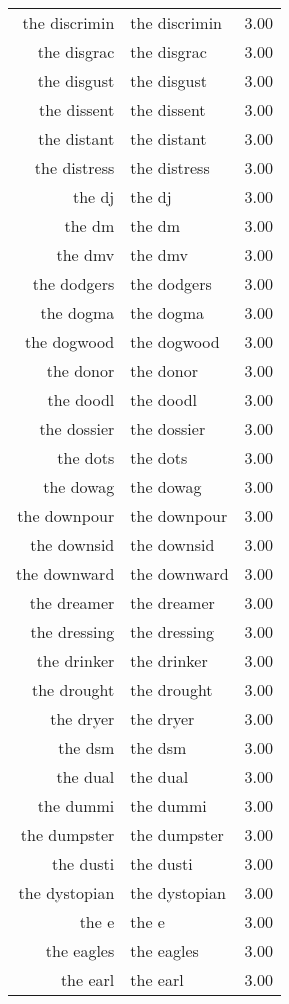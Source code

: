 \begin{table}[ht]
\begin{tabular}{rlr}
  the discrimin & the discrimin & 3.00 \\ 
  the disgrac & the disgrac & 3.00 \\ 
  the disgust & the disgust & 3.00 \\ 
  the dissent & the dissent & 3.00 \\ 
  the distant & the distant & 3.00 \\ 
  the distress & the distress & 3.00 \\ 
  the dj & the dj & 3.00 \\ 
  the dm & the dm & 3.00 \\ 
  the dmv & the dmv & 3.00 \\ 
  the dodgers & the dodgers & 3.00 \\ 
  the dogma & the dogma & 3.00 \\ 
  the dogwood & the dogwood & 3.00 \\ 
  the donor & the donor & 3.00 \\ 
  the doodl & the doodl & 3.00 \\ 
  the dossier & the dossier & 3.00 \\ 
  the dots & the dots & 3.00 \\ 
  the dowag & the dowag & 3.00 \\ 
  the downpour & the downpour & 3.00 \\ 
  the downsid & the downsid & 3.00 \\ 
  the downward & the downward & 3.00 \\ 
  the dreamer & the dreamer & 3.00 \\ 
  the dressing & the dressing & 3.00 \\ 
  the drinker & the drinker & 3.00 \\ 
  the drought & the drought & 3.00 \\ 
  the dryer & the dryer & 3.00 \\ 
  the dsm & the dsm & 3.00 \\ 
  the dual & the dual & 3.00 \\ 
  the dummi & the dummi & 3.00 \\ 
  the dumpster & the dumpster & 3.00 \\ 
  the dusti & the dusti & 3.00 \\ 
  the dystopian & the dystopian & 3.00 \\ 
  the e & the e & 3.00 \\ 
  the eagles & the eagles & 3.00 \\ 
  the earl & the earl & 3.00 \\ 

\end{tabular}
\end{table}
